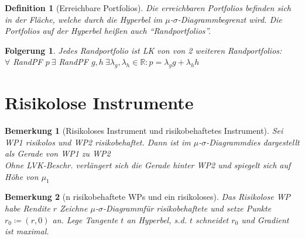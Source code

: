 \documentclass[a4paper]{article}
\theoremstyle{break}
\newcommand{\msd}{$\mu$-$\sigma$-Diagramm}
\newtheorem{defi}{Definition}[section]
\newtheorem{ann}{Bemerkung}[section]
\newtheorem{der}{Folgerung}[section]
\begin{document}
    \begin{defi}[Erreichbare Portfolios]
        Die erreichbaren Portfolios befinden sich in der Fläche, welche durch die Hyperbel im \msd begrenzt wird.
        Die Portfolios auf der Hyperbel heißen auch ``Randportfolios''.
    \end{defi}
    \begin{der}
        Jedes Randportfolio ist LK von von 2 weiteren Randportfolios:\\
        $\forall$ RandPF $p ~ \exists$ RandPF $g, h ~ \exists \lambda_g, \lambda_h \in \mathbb{R}: p = \lambda_g g + \lambda_h h$
    \end{der}
\section{Risikolose Instrumente}
    \begin{ann}[Risikoloses Instrument und risikobehaftetes Instrument]
        Sei WP1 risikolos und WP2 risikobehaftet. Dann ist im \msd dies dargestellt als Gerade von WP1 zu WP2\\
        Ohne LVK-Beschr. verlängert sich die Gerade hinter WP2 und spiegelt sich auf Höhe von $\mu_1$
    \end{ann}
    \begin{ann}[n risikobehaftete WPs und ein risikoloses]
        Das Risikolose WP habe Rendite $r$
        Zeichne \msd für risikobehaftete und setze Punkte $r_0 \coloneqq (r,0)$ an. Lege Tangente $t$ an Hyperbel, s.d. $t$ schneidet $r_0$ und Gradient ist maximal. 
    \end{ann}
\end{document}
